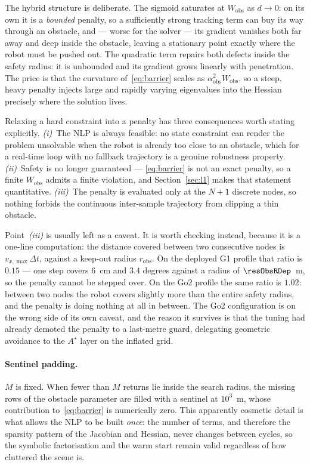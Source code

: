 \documentclass[11pt,a4paper]{article}
\newcommand{\astar}{$A^\star$}
\newcommand{\Wobs}{W_{\mathrm{obs}}}
\newcommand{\aobs}{\alpha_{\mathrm{obs}}}
\newcommand{\robs}{r_{\mathrm{obs}}}
\begin{document}
The hybrid structure is deliberate. The sigmoid saturates at $\Wobs$ as $d\to0$: on its own it is a
\emph{bounded} penalty, so a sufficiently strong tracking term can buy its way through an obstacle, and ---
worse for the solver --- its gradient vanishes both far away and deep inside the obstacle, leaving a
stationary point exactly where the robot must be pushed out. The quadratic term repairs both defects inside
the safety radius: it is unbounded and its gradient grows linearly with penetration. The price is that the
curvature of~\eqref{eq:barrier} scales as $\aobs^2\Wobs$, so a steep, heavy penalty injects large and rapidly
varying eigenvalues into the Hessian precisely where the solution lives.

Relaxing a hard constraint into a penalty has three consequences worth stating explicitly.
\emph{(i)}~The NLP is always feasible: no state constraint can render the problem unsolvable when the robot
is already too close to an obstacle, which for a real-time loop with no fallback trajectory is a genuine
robustness property. \emph{(ii)}~Safety is no longer guaranteed --- \eqref{eq:barrier} is not an exact
penalty, so a finite $\Wobs$ admits a finite violation, and Section~\ref{sec:l1} makes that statement
quantitative. \emph{(iii)}~The penalty is evaluated only at the $N+1$ discrete nodes, so nothing forbids the
continuous inter-sample trajectory from clipping a thin obstacle.

Point~\emph{(iii)} is usually left as a caveat. It is worth checking instead, because it is a one-line
computation: the distance covered between two consecutive nodes is $v_{x,\max}\Delta t$, against a keep-out
radius $\robs$. On the deployed G1 profile that ratio is $0.15$ --- one step covers $6$~cm and $3.4$ degrees
against a radius of $\resObsRDep$~m, so the penalty cannot be stepped over. On the Go2 profile the same ratio
is $1.02$: between two nodes the robot covers slightly more than the entire safety radius, and the penalty is
doing nothing at all in between. The Go2 configuration is on the wrong side of its own caveat, and the reason
it survives is that the tuning had already demoted the penalty to a last-metre guard, delegating geometric
avoidance to the \astar{} layer on the inflated grid.

\paragraph{Sentinel padding.} $M$ is fixed. When fewer than $M$ returns lie inside the search radius, the
missing rows of the obstacle parameter are filled with a sentinel at $10^3$~m, whose contribution
to~\eqref{eq:barrier} is numerically zero. This apparently cosmetic detail is what allows the NLP to be built
\emph{once}: the number of terms, and therefore the sparsity pattern of the Jacobian and Hessian, never
changes between cycles, so the symbolic factorisation and the warm start remain valid regardless of how
cluttered the scene is.
\end{document}
